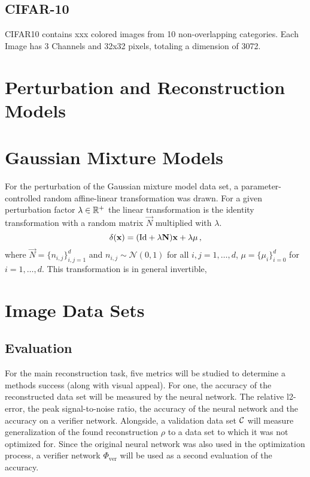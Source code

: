 \subsection{CIFAR-10}
CIFAR10 contains xxx colored images from 10 non-overlapping categories.
Each Image has 3 Channels and 32x32 pixels, totaling a dimension of 3072.





\section{Perturbation and Reconstruction Models}


\section{Gaussian Mixture Models}

For the perturbation of the Gaussian mixture model data set, a parameter-controlled random affine-linear transformation
was drawn.
For a given perturbation factor $\lambda \in \mathbb{R} ^+$
the linear transformation is the identity transformation with a random matrix $\vec N$ multiplied with $\lambda$.
\[
    \delta(\mathbf x) = (\textnormal{Id} + \lambda \mathbf N)\mathbf x + \lambda \mu \,,
\]
where $\vec N = \{n_{i, j}\}_{i, j = 1}^{d}$ and $n_{i,j} \sim \mathcal N (0, 1)$ for all $i, j = 1 , \ldots, d$, 
$\mu = \{\mu_i\}_{i=0}^d$ for $i=1,\ldots,d$.
This transformation is in general invertible,

\section{Image Data Sets}

\begin{minipage}{0.5\textwidth}

\end{minipage}
\begin{minipage}{0.5\textwidth}

\end{minipage}





\subsection{Evaluation}




For the main reconstruction task, 
five metrics will be studied to determine a methods success (along with visual appeal).
For one, the accuracy of the reconstructed data set will be measured by the neural network.
The relative l2-error, the peak signal-to-noise ratio, the accuracy of the neural network and the accuracy on a verifier network.
Alongside, a validation data set $\mathcal C$ will measure generalization of the found reconstruction $\rho$ to a data set to which it was not optimized for.
Since the original neural network was also used in the optimization process, a verifier network $\Phi_{\text{ver}}$ will be used as a second evaluation of the accuracy.

